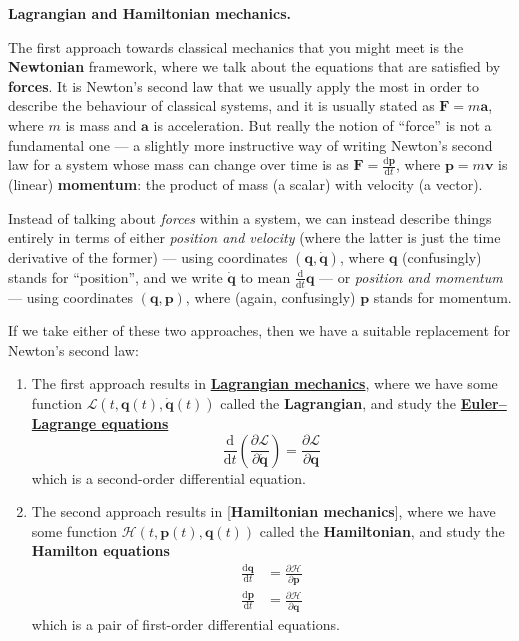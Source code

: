 \documentclass[fleqn,a4paper]{article}
\providecommand{\tightlist}{\setlength{\itemsep}{0pt}\setlength{\parskip}{0pt}}
\newenvironment{technical}[1]{\textbf{#1.}\par\vspace{.5\baselineskip}\everypar{\setlength{\parindent}{1.5em}}}{}
\theoremstyle{definition}
\theoremstyle{definition}
\theoremstyle{definition}
\theoremstyle{definition}
\theoremstyle{remark}
\begin{document}
\begin{technical}{Lagrangian and Hamiltonian mechanics}
The first approach towards classical mechanics that you might meet is the \textbf{Newtonian} framework, where we talk about the equations that are satisfied by \textbf{forces}.
It is Newton's second law that we usually apply the most in order to describe the behaviour of classical systems, and it is usually stated as \(\mathbf{F}=m\mathbf{a}\), where \(m\) is mass and \(\mathbf{a}\) is acceleration.
But really the notion of ``force'' is not a fundamental one --- a slightly more instructive way of writing Newton's second law for a system whose mass can change over time is as \(\mathbf{F}=\frac{\mathrm{d}\mathbf{p}}{\mathrm{d}t}\), where \(\mathbf{p}=m\mathbf{v}\) is (linear) \textbf{momentum}: the product of mass (a scalar) with velocity (a vector).

Instead of talking about \emph{forces} within a system, we can instead describe things entirely in terms of either \emph{position and velocity} (where the latter is just the time derivative of the former) --- using coordinates \((\mathbf{q},\dot{\mathbf{q}})\), where \(\mathbf{q}\) (confusingly) stands for ``position'', and we write \(\dot{\mathbf{q}}\) to mean \(\frac{\mathrm{d}}{\mathrm{d}t}\mathbf{q}\) --- or \emph{position and momentum} --- using coordinates \((\mathbf{q},\mathbf{p})\), where (again, confusingly) \(\mathbf{p}\) stands for momentum.

If we take either of these two approaches, then we have a suitable replacement for Newton's second law:

\begin{enumerate}
\def\labelenumi{\arabic{enumi}.}
\tightlist
\item
  The first approach results in \href{https://en.wikipedia.org/wiki/Lagrangian_mechanics}{\textbf{Lagrangian mechanics}}, where we have some function \(\mathcal{L}(t,\mathbf{q}(t),\dot{\mathbf{q}}(t))\) called the \textbf{Lagrangian}, and study the \href{https://en.wikipedia.org/wiki/Euler\%E2\%80\%93Lagrange_equation}{\textbf{Euler--Lagrange equations}}
  \[
   \frac{\mathrm{d}}{\mathrm{d}t}\left(\frac{\partial\mathcal{L}}{\partial \dot{\mathbf{q}}}\right)
   = \frac{\partial\mathcal{L}}{\partial\mathbf{q}}
    \]
  which is a second-order differential equation.
\item
  The second approach results in {[}\textbf{Hamiltonian mechanics}{]}, where we have some function \(\mathcal{H}(t,\mathbf{p}(t),\mathbf{q}(t))\) called the \textbf{Hamiltonian}, and study the \textbf{Hamilton equations}
  \[
   \begin{aligned}
     \frac{\mathrm{d}\mathbf{q}}{\mathrm{d}t}
     &= \frac{\partial\mathcal{H}}{\partial\mathbf{p}}
   \\\frac{\mathrm{d}\mathbf{p}}{\mathrm{d}t}
     &= \frac{\partial\mathcal{H}}{\partial\mathbf{q}}
   \end{aligned}
    \]
  which is a pair of first-order differential equations.
\end{enumerate}


\end{technical}
\end{document}
